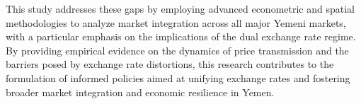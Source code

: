 This study addresses these gaps by employing advanced econometric and spatial methodologies to analyze market integration across all major Yemeni markets, with a particular emphasis on the implications of the dual exchange rate regime. By providing empirical evidence on the dynamics of price transmission and the barriers posed by exchange rate distortions, this research contributes to the formulation of informed policies aimed at unifying exchange rates and fostering broader market integration and economic resilience in Yemen.
